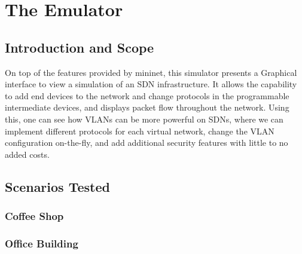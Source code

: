 \documentclass[conference]{IEEEtran}
\begin{document}




\section{\textbf{The Emulator}}
    \subsection{Introduction and Scope}
        On top of the features provided by mininet, this simulator presents a Graphical interface to view a simulation of an SDN infrastructure. 
        It allows the capability to add end devices to the network and change protocols in the programmable intermediate devices, and displays packet flow throughout the network. 
        Using this, one can see how VLANs can be more powerful on SDNs, where we can implement different protocols for each virtual network, change the VLAN configuration on-the-fly, and add additional security features with little to no added costs.    


    \subsection{Scenarios Tested}
        \subsubsection{Coffee Shop}
        \subsubsection{Office Building}
\end{document}
